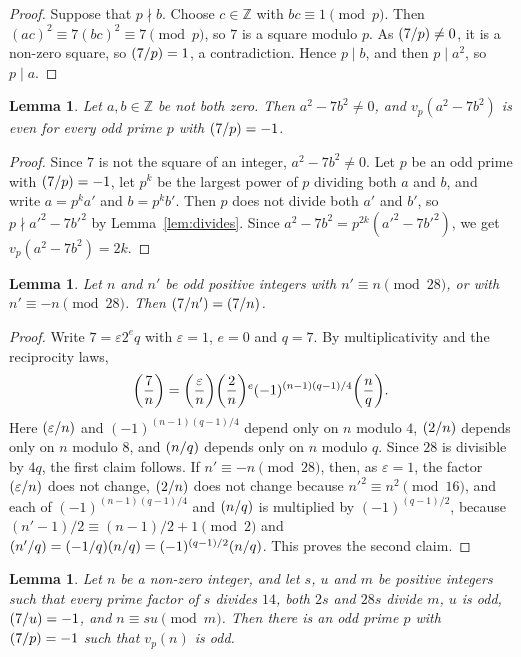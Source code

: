 \documentclass[11pt]{article}
\newtheorem{lemma}[theorem]{Lemma}
\newcommand{\Z}{\mathbb{Z}}
\newcommand{\leg}[2]{\mathchoice{\biggl(\dfrac{#1}{#2}\biggr)}{(#1/#2)}{(#1/#2)}{(#1/#2)}}
\begin{document}
\begin{proof}
Suppose that $p\nmid b$. Choose $c\in\Z$ with $bc\equiv1\pmod p$. Then $(ac)^2\equiv7(bc)^2\equiv7\pmod p$, so $7$ is a square modulo $p$. As $\leg{7}{p}\neq0$, it is a non-zero square, so $\leg{7}{p}=1$, a contradiction. Hence $p\mid b$, and then $p\mid a^2$, so $p\mid a$.
\end{proof}

\begin{lemma}\label{lem:even}
Let $a,b\in\Z$ be not both zero. Then $a^2-7b^2\neq0$, and $v_p(a^2-7b^2)$ is even for every odd prime $p$ with $\leg{7}{p}=-1$.
\end{lemma}

\begin{proof}
Since $7$ is not the square of an integer, $a^2-7b^2\neq0$. Let $p$ be an odd prime with $\leg{7}{p}=-1$, let $p^k$ be the largest power of $p$ dividing both $a$ and $b$, and write $a=p^ka'$ and $b=p^kb'$. Then $p$ does not divide both $a'$ and $b'$, so $p\nmid a'^2-7b'^2$ by Lemma~\ref{lem:divides}. Since $a^2-7b^2=p^{2k}(a'^2-7b'^2)$, we get $v_p(a^2-7b^2)=2k$.
\end{proof}

\begin{lemma}\label{lem:period}
Let $n$ and $n'$ be odd positive integers with $n'\equiv n\pmod{28}$, or with $n'\equiv-n\pmod{28}$. Then $\leg{7}{n'}=\leg{7}{n}$.
\end{lemma}

\begin{proof}
Write $7=\varepsilon2^eq$ with $\varepsilon=1$, $e=0$ and $q=7$. By multiplicativity and the reciprocity laws,
\[
\leg{7}{n}=\leg{\varepsilon}{n}\leg{2}{n}^e(-1)^{(n-1)(q-1)/4}\leg{n}{q}.
\]
Here $\leg{\varepsilon}{n}$ and $(-1)^{(n-1)(q-1)/4}$ depend only on $n$ modulo $4$, $\leg{2}{n}$ depends only on $n$ modulo $8$, and $\leg{n}{q}$ depends only on $n$ modulo $q$. Since $28$ is divisible by $4q$, the first claim follows. If $n'\equiv-n\pmod{28}$, then, as $\varepsilon=1$, the factor $\leg{\varepsilon}{n}$ does not change, $\leg{2}{n}$ does not change because $n'^2\equiv n^2\pmod{16}$, and each of $(-1)^{(n-1)(q-1)/4}$ and $\leg{n}{q}$ is multiplied by $(-1)^{(q-1)/2}$, because $(n'-1)/2\equiv(n-1)/2+1\pmod 2$ and $\leg{n'}{q}=\leg{-1}{q}\leg{n}{q}=(-1)^{(q-1)/2}\leg{n}{q}$. This proves the second claim.
\end{proof}

\begin{lemma}\label{lem:odd}
Let $n$ be a non-zero integer, and let $s$, $u$ and $m$ be positive integers such that every prime factor of $s$ divides $14$, both $2s$ and $28s$ divide $m$, $u$ is odd, $\leg{7}{u}=-1$, and $n\equiv su\pmod m$. Then there is an odd prime $p$ with $\leg{7}{p}=-1$ such that $v_p(n)$ is odd.
\end{lemma}
\end{document}
